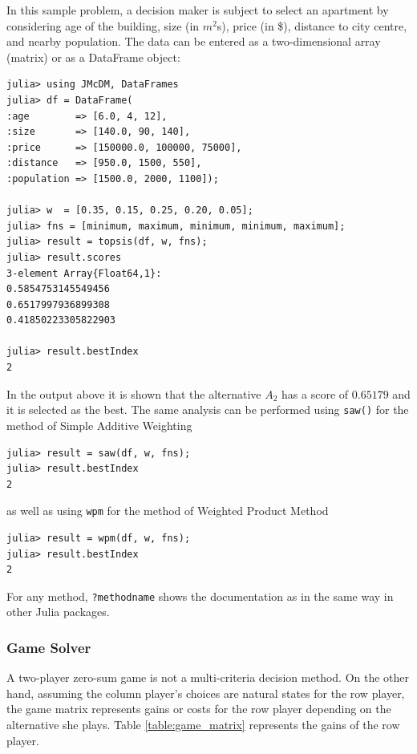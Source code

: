 \documentclass[preprint,review, 12pt, a4paper]{elsarticle}
\begin{document}
In this sample problem, a decision maker is subject to select an apartment by considering age of the building, size (in $m^2$s), price (in \$), distance to city centre, and nearby population.
The data can be entered as a two-dimensional array (matrix) or as a DataFrame object:

\begin{verbatim}
julia> using JMcDM, DataFrames
julia> df = DataFrame(
:age        => [6.0, 4, 12],
:size       => [140.0, 90, 140],
:price      => [150000.0, 100000, 75000],
:distance   => [950.0, 1500, 550],
:population => [1500.0, 2000, 1100]);

julia> w  = [0.35, 0.15, 0.25, 0.20, 0.05];
julia> fns = [minimum, maximum, minimum, minimum, maximum];
julia> result = topsis(df, w, fns);
julia> result.scores
3-element Array{Float64,1}:
0.5854753145549456
0.6517997936899308
0.41850223305822903

julia> result.bestIndex
2
\end{verbatim}

In the output above it is shown that the alternative $A_2$ has a score of $0.65179$ and it is selected as the best. The same analysis can be performed using \texttt{saw()} for the method of Simple Additive Weighting

\begin{verbatim}
julia> result = saw(df, w, fns);
julia> result.bestIndex
2
\end{verbatim}

\noindent as well as using \texttt{wpm} for the method of Weighted Product Method

\begin{verbatim}
julia> result = wpm(df, w, fns);
julia> result.bestIndex
2
\end{verbatim}

For any method, \texttt{?methodname} shows the documentation as in the same way in other Julia packages.

\subsubsection{Game Solver}

A two-player zero-sum game is not a multi-criteria decision method. On the other hand, assuming the column player's choices are natural states for the row player, the game matrix represents gains or costs for the 
row player depending on the alternative she plays. Table \ref{table:game_matrix} represents the gains of the row player.
\end{document}
